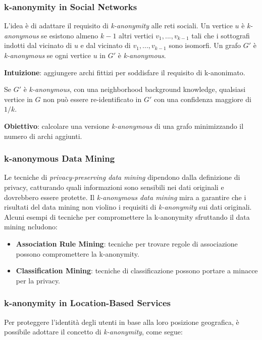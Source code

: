 \documentclass{report}
\begin{document}
\subsubsection{k-anonymity in Social Networks}
L'idea è di adattare il requisito di \textit{k-anonymity} alle reti sociali. 
Un vertice $u$ è \textit{k-anonymous} se esistono almeno $k-1$ altri vertici $v_1, ..., v_{k-1}$ tali che i sottografi indotti dal vicinato di $u$ e dal vicinato di $v_1, ..., v_{k-1}$ sono isomorfi. 
Un grafo $G'$ è \textit{k-anonymous} se ogni vertice $u$ in $G'$ è \textit{k-anonymous}. 

\noindent \textbf{Intuizione}: aggiungere archi fittizi per soddisfare il requisito di k-anonimato.

\noindent Se $G'$ è \textit{k-anonymous}, con una neighborhood background knowledge, qualsiasi vertice in $G$ non può essere re-identificato in $G'$ con una confidenza maggiore di $1/k$.

\noindent \textbf{Obiettivo}: calcolare una versione \textit{k-anonymous} di una grafo minimizzando il numero di archi aggiunti.

\subsubsection{ k-anonymous Data Mining}
Le tecniche di \textit{privacy-preserving data mining} dipendono dalla definizione di privacy, catturando quali informazioni sono sensibili nei dati originali e dovrebbero essere protette. 
Il \textit{k-anonymous data mining} mira a garantire che i risultati del data mining non violino i requisiti di \textit{k-anonymity} sui dati originali.
Alcuni esempi di tecniche per compromettere la k-anonymity sfruttando il data mining ncludono:

\begin{itemize}
    \item \textbf{Association Rule Mining}: tecniche per trovare regole di associazione possono compromettere la k-anonymity.
    \item \textbf{Classification Mining}: tecniche di classificazione possono portare a minacce per la privacy.
\end{itemize}

\subsubsection{ k-anonymity in Location-Based Services}
Per proteggere l'identità degli utenti in base alla loro posizione geografica, è possibile adottare il concetto di \textit{k-anonymity}, come segue:
\end{document}
